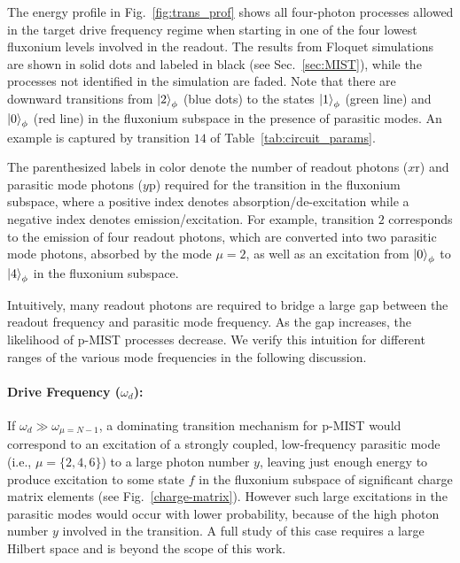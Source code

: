 \documentclass[%
reprint,
superscriptaddress,
 amsmath,amssymb,
 aps,
 prx,
longbibliography,
floatfix,
]{revtex4-2}
\begin{document}
The energy profile in Fig.~\ref{fig:trans_prof} shows all four-photon processes allowed in the target drive frequency regime when starting in one of the four lowest fluxonium levels involved in the readout. The results from Floquet simulations are  shown in solid dots and labeled in black (see Sec.~\ref{sec:MIST}), while the processes not identified in the simulation are faded. Note that there are downward transitions from $\ket{2}_\phi$ (blue dots) to the states $\ket{1}_\phi$ (green line) and $\ket{0}_\phi$ (red line) in the fluxonium subspace in the presence of parasitic modes. An example is captured by transition $14$ of Table~\ref{tab:circuit_params}. 

The parenthesized labels in color denote the number of readout photons ($x \mathrm{r}$) and parasitic mode photons ($y\mathrm{p}$) required for the transition in the fluxonium subspace, where a positive index denotes absorption/de-excitation while a negative index denotes emission/excitation. For example, transition $2$ corresponds to the emission of four readout photons, which are converted into two parasitic mode photons, absorbed by the mode $\mu=2$, as well as an excitation from $\ket{0}_\phi$ to $\ket{4}_\phi$ in the fluxonium subspace. 

Intuitively, many readout photons are required to bridge a large gap between the readout frequency and parasitic mode frequency. As the gap increases, the likelihood of p-MIST processes decrease. We verify this intuition for different ranges of the various mode frequencies in the following discussion.

\paragraph{Drive Frequency ($\omega_d$):} If  $\omega_d\gg \omega_{\mu=N-1}$, a dominating transition mechanism for p-MIST would correspond to an excitation of a strongly coupled, low-frequency parasitic mode (i.e., $\mu=\{2,4,6\}$) to a large photon number $y$, leaving just enough energy to produce excitation to some state $f$ in the fluxonium subspace of significant charge matrix elements (see Fig.~\ref{charge-matrix}). However such large excitations in the parasitic modes would occur with lower probability, because of the high photon number $y$ involved in the transition. A full study of this case requires a large Hilbert space and is beyond the scope of this work. 
\end{document}
